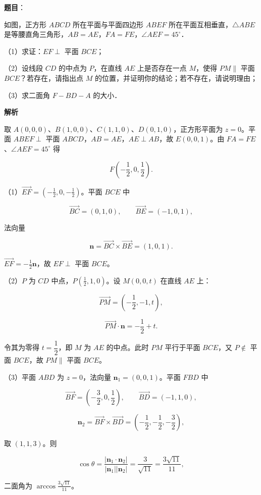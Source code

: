 \begin{answer}

\textbf{题目}：

如图，正方形 $ABCD$ 所在平面与平面四边形 $ABEF$ 所在平面互相垂直，$\triangle ABE$ 是等腰直角三角形，$AB=AE$，$FA=FE$，$\angle AEF=45^\circ$．
\nopagebreak[4]
\begin{center}\end{center}
\nopagebreak[4]
（1）求证：$EF\perp$ 平面 $BCE$；

（2）设线段 $CD$ 的中点为 $P$，在直线 $AE$ 上是否存在一点 $M$，使得 $PM\parallel$ 平面 $BCE$？若存在，请指出点 $M$ 的位置，并证明你的结论；若不存在，请说明理由；

（3）求二面角 $F-BD-A$ 的大小．

\textbf{解析}

取 $A(0,0,0)$、$B(1,0,0)$、$C(1,1,0)$、$D(0,1,0)$，正方形平面为 $z=0$。平面 $ABEF\perp$ 平面 $ABCD$，$AB=AE$，$AE\perp AB$，故 $E(0,0,1)$。由 $FA=FE$、$\angle AEF=45^\circ$ 得

\nopagebreak[4]
\[F\left(-\frac12,0,\frac12\right).\]

（1）$\overrightarrow{EF}=\left(-\frac12,0,-\frac12\right)$。平面 $BCE$ 中

\nopagebreak[4]
\[\overrightarrow{BC}=(0,1,0),\qquad \overrightarrow{BE}=(-1,0,1),\]

法向量

\nopagebreak[4]
\[\mathbf n=\overrightarrow{BC}\times\overrightarrow{BE}=(1,0,1).\]

$\overrightarrow{EF}=-\frac12\mathbf n$，故 $EF\perp$ 平面 $BCE$。

（2）$P$ 为 $CD$ 中点，$P\left(\frac12,1,0\right)$。设 $M(0,0,t)$ 在直线 $AE$ 上：

\nopagebreak[4]
\[\overrightarrow{PM}=\left(-\frac12,-1,t\right),\]

\nopagebreak[4]
\[\overrightarrow{PM}\cdot\mathbf n=-\frac12+t .\]

令其为零得 $t=\dfrac12$，即 $M$ 为 $AE$ 的中点。此时 $PM$ 平行于平面 $BCE$，又 $P\notin$ 平面 $BCE$，故 $PM\parallel$ 平面 $BCE$。

（3）平面 $ABD$ 为 $z=0$，法向量 $\mathbf n_1=(0,0,1)$。平面 $FBD$ 中

\nopagebreak[4]
\[\overrightarrow{BF}=\left(-\frac32,0,\frac12\right),\qquad
\overrightarrow{BD}=(-1,1,0),\]

\nopagebreak[4]
\[\mathbf n_2=\overrightarrow{BF}\times\overrightarrow{BD}
=\left(-\frac12,-\frac12,-\frac32\right),\]

取 $(1,1,3)$。则

\nopagebreak[4]
\[\cos\theta=\frac{|\mathbf n_1\cdot\mathbf n_2|}{|\mathbf n_1||\mathbf n_2|}
=\frac{3}{\sqrt{11}}=\frac{3\sqrt{11}}{11},\]

二面角为 $\arccos\frac{3\sqrt{11}}{11}$。


\end{answer}

